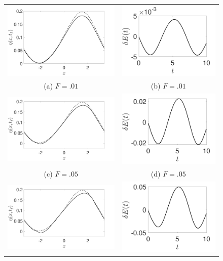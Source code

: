 \documentclass[a4paper,11pt]{article}
\begin{document}
\begin{figure}
\centering
\begin{tabular}{cc}
\includegraphics[width=.45\textwidth]{profiles_wm_1_modu_pt3} & \includegraphics[width=.4\textwidth]{energy_wm_1_modu_pt3}\\
(a)  $F=.01$ & (b)  $F=.01$\\
\includegraphics[width=.45\textwidth]{profiles_wm_5_modu_pt3} & \includegraphics[width=.4\textwidth]{energy_wm_5_modu_pt3}\\
(c)  $F=.05$ & (d)  $F=.05$\\
\includegraphics[width=.45\textwidth]{profiles_wm_10_modu_pt3} & \includegraphics[width=.4\textwidth]{energy_wm_10_modu_pt3}\\

\end{tabular}
\end{figure}
\end{document}
